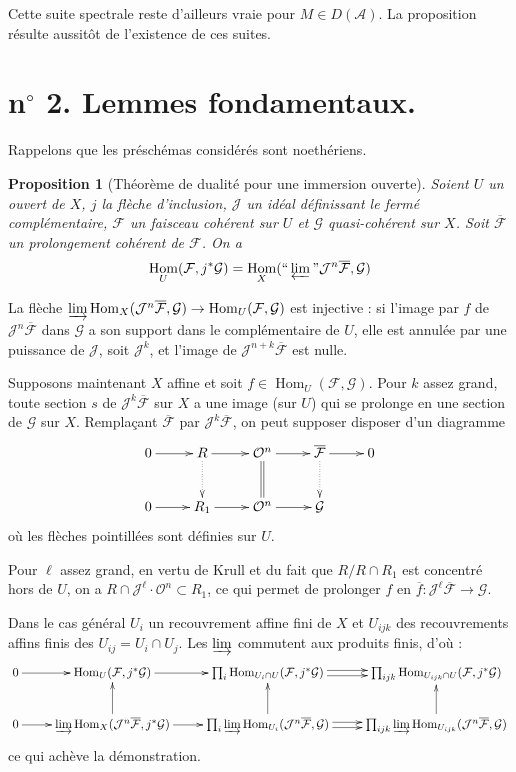 \documentclass[12pt]{amsart}
\theoremstyle{plain}
\newtheorem{prop}{Proposition}
\theoremstyle{definition}
\DeclareMathOperator{\Hom}{Hom}
\newcommand{\cF}{\mathcal{F}}
\newcommand{\cG}{\mathcal{G}}
\newcommand{\cJ}{\mathcal{J}}
\newcommand{\cO}{\mathcal{O}}
\newcommand{\cA}{\mathcal{A}}
\newcommand{\cD}{D}
\begin{document}
Cette suite spectrale reste d'ailleurs vraie pour $M \in \cD(\cA)$. La proposition r\'esulte aussit\^ot de l'existence de ces suites.

\section*{n$^{\circ}$ 2. Lemmes fondamentaux.}

Rappelons que les pr\'esch\'emas consid\'er\'es sont noeth\'eriens.

\begin{prop}[Th\'eor\`eme de dualit\'e pour une immersion ouverte]
Soient $U$ un ouvert de $X$, $j$ la fl\`eche d'inclusion, $\cJ$ un id\'eal d\'efinissant le ferm\'e compl\'ementaire, $\cF$ un faisceau coh\'erent sur $U$ et $\cG$ quasi-coh\'erent sur $X$. Soit $\overline{\cF}$ un prolongement coh\'erent de $\cF$. On a
\begin{equation}
\Hom_{U}(\cF, j^{*}\cG) = \Hom_{X}(\text{``}\varprojlim\text{''} \cJ^{n}\overline{\cF}, \cG)
\end{equation}
\end{prop}

La fl\`eche $\varinjlim \Hom_{X}(\cJ^{n}\overline{\cF}, \cG) \to \Hom_{U}(\cF, \cG)$ est injective : si l'image par $f$ de $\cJ^{n}\overline{\cF}$ dans $\cG$ a son support dans le compl\'ementaire de $U$, elle est annul\'ee par une puissance de $\cJ$, soit $\cJ^{k}$, et l'image de $\cJ^{n+k}\overline{\cF}$ est nulle.

Supposons maintenant $X$ affine et soit $f \in \Hom_{U}(\cF, \cG)$. Pour $k$ assez grand, toute section $s$ de $\cJ^{k}\overline{\cF}$ sur $X$ a une image (sur $U$) qui se prolonge en une section de $\cG$ sur $X$. Rempla\c{c}ant $\overline{\cF}$ par $\cJ^{k}\overline{\cF}$, on peut supposer disposer d'un diagramme
\[
\xymatrix{
0 \ar[r] & R \ar[r] \ar@{.>}[d] & \cO^{n} \ar[r] \ar@{=}[d] & \overline{\cF} \ar[r] \ar@{.>}[d] & 0 \\
0 \ar[r] & R_{1} \ar[r] & \cO^{n} \ar[r] & \cG &
}
\]
o\`u les fl\`eches pointill\'ees sont d\'efinies sur $U$.

Pour $\ell$ assez grand, en vertu de Krull et du fait que $R/R \cap R_{1}$ est concentr\'e hors de $U$, on a $R \cap \cJ^{\ell} \cdot \cO^{n} \subset R_{1}$, ce qui permet de prolonger $f$ en $\overline{f}: \cJ^{\ell}\overline{\cF} \to \cG$.

Dans le cas g\'en\'eral $U_{i}$ un recouvrement affine fini de $X$ et $U_{ijk}$ des recouvrements affins finis des $U_{ij} = U_{i} \cap U_{j}$. Les $\varinjlim$ commutent aux produits finis, d'o\`u :
\[
\xymatrix{
0 \ar[r] & \Hom_{U}(\cF,j^{*}\cG) \ar[r] & \prod_{i} \Hom_{U_{i} \cap U}(\cF,j^{*}\cG) \ar@<.5ex>[r] \ar@<-.5ex>[r] & \prod_{ijk} \Hom_{U_{ijk} \cap U}(\cF,j^{*}\cG) \\
0 \ar[r] & \varinjlim \Hom_{X}(\cJ^{n}\overline{\cF},j^{*}\cG) \ar[r] \ar[u] & \prod_{i} \varinjlim \Hom_{U_{i}}(\cJ^{n}\overline{\cF},\cG) \ar@<.5ex>[r] \ar@<-.5ex>[r] \ar[u] & \prod_{ijk} \varinjlim \Hom_{U_{ijk}}(\cJ^{n}\overline{\cF},\cG) \ar[u]
}
\]
ce qui ach\`eve la d\'emonstration.
\end{document}

